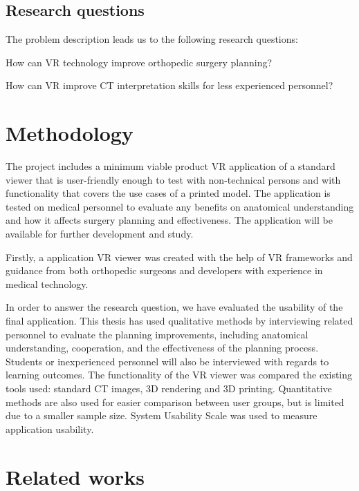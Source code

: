 \documentclass[a4paper]{report}
\begin{document}
\subsection{Research questions}
The problem description leads us to the following research questions:

How can VR technology improve orthopedic surgery planning?


How can VR improve CT interpretation skills for less experienced personnel?

\section{Methodology}

The project includes a minimum viable product VR application of a standard viewer that is user-friendly enough to test with non-technical persons and with functionality that covers the use cases of a printed model.
The application is tested on medical personnel to evaluate any benefits on anatomical understanding and how it affects surgery planning and effectiveness. The application will be available for further development and study.

Firstly, a application VR viewer was created with the help of VR frameworks and guidance from both orthopedic surgeons and developers with experience in medical technology.

In order to answer the research question, we have evaluated the usability of the final application.
This thesis has used qualitative methods by interviewing related personnel to evaluate the planning improvements, including anatomical understanding, cooperation, and the effectiveness of the planning process. Students or inexperienced personnel will also be interviewed with regards to learning outcomes.
The functionality of the VR viewer was compared the existing tools used: standard CT images, 3D rendering and 3D printing.
Quantitative methods are also used for easier comparison between user groups, but is limited due to a smaller sample size. System Usability Scale was used to measure application usability.

\section{Related works}
\end{document}
